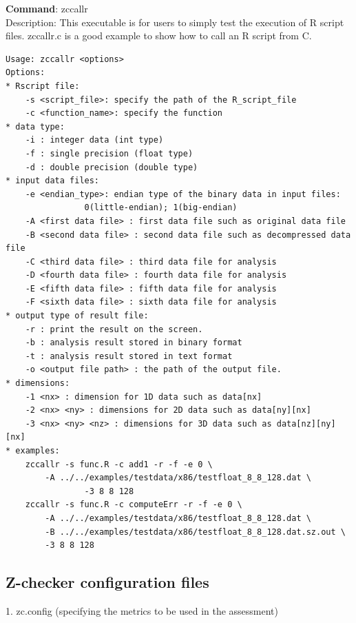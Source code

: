 \textbf{Command}: zccallr\\
Description: This executable is for users to simply test the execution of R script files. zccallr.c is a good example to show how to call an R script from C.
\begin{lstlisting}[style=ShellStyleInline, basicstyle = \footnotesize\ttfamily]
Usage: zccallr <options>
Options:
* Rscript file:
	-s <script_file>: specify the path of the R_script_file
	-c <function_name>: specify the function
* data type:
	-i : integer data (int type)
	-f : single precision (float type)
	-d : double precision (double type)
* input data files:
	-e <endian_type>: endian type of the binary data in input files:
				0(little-endian); 1(big-endian)
	-A <first data file> : first data file such as original data file
	-B <second data file> : second data file such as decompressed data file
	-C <third data file> : third data file for analysis
	-D <fourth data file> : fourth data file for analysis
	-E <fifth data file> : fifth data file for analysis
	-F <sixth data file> : sixth data file for analysis
* output type of result file:
	-r : print the result on the screen.
	-b : analysis result stored in binary format
	-t : analysis result stored in text format
	-o <output file path> : the path of the output file.
* dimensions:
	-1 <nx> : dimension for 1D data such as data[nx]
	-2 <nx> <ny> : dimensions for 2D data such as data[ny][nx]
	-3 <nx> <ny> <nz> : dimensions for 3D data such as data[nz][ny][nx]
* examples:
	zccallr -s func.R -c add1 -r -f -e 0 \
		-A ../../examples/testdata/x86/testfloat_8_8_128.dat \
				-3 8 8 128
	zccallr -s func.R -c computeErr -r -f -e 0 \
		-A ../../examples/testdata/x86/testfloat_8_8_128.dat \
		-B ../../examples/testdata/x86/testfloat_8_8_128.dat.sz.out \
		-3 8 8 128
\end{lstlisting}

\subsection{Z-checker configuration files}

1. zc.config (specifying the metrics to be used in the assessment)

